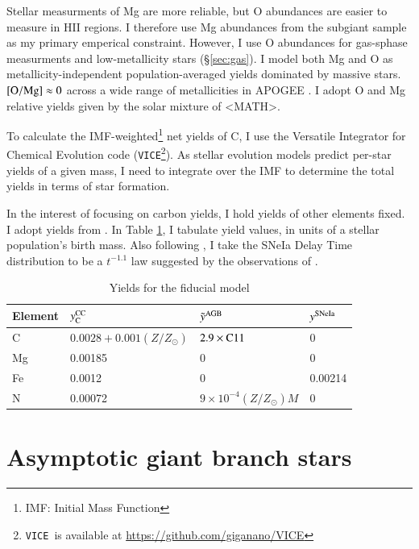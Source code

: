 \documentclass[12pt,oneside]{report}
\newcommand{\VICE}{\texttt{VICE}}
\newcommand{\Ycc}{\ensuremath{y_{\rm C}^{\rm CC}}}
\begin{document}
Stellar measurments of Mg are more reliable, but O abundances are easier to measure in HII regions. 
I therefore use Mg abundances from the \citet{jack_subgiant} subgiant sample as my primary emperical constraint. However, I use O abundances for gas-sphase measurments and low-metallicity stars (\S \ref{sec:gas}). I model both Mg and O as metallicity-independent population-averaged yields dominated by massive stars. ${\rm [O/Mg]}\approx 0$ across a wide range of metallicities in APOGEE \citep{Weinberg+19, Weinberg+22}. 
I adopt O and Mg relative yields given by the solar mixture of \cite{asplund+09} <MATH>.

To calculate the IMF-weighted\footnote{IMF: Initial Mass Function} net yields of C, I use the Versatile Integrator for Chemical Evolution code (\VICE\footnote{\VICE~is available at \url{https://github.com/giganano/VICE}}).
As stellar evolution models predict per-star yields of a given mass, I need to integrate over the IMF to determine the total yields in terms of star formation.

In the interest of focusing on carbon yields, I hold yields of other elements fixed. 
I adopt yields from \citet{james+21, james+22}.
In Table \ref{tab:fiducial_mod}, I tabulate yield values, in units of a stellar population's birth mass.
Also following \citet{james+21, james+22}, I take the SNeIa Delay Time distribution to be a
$t^{-1.1}$ law suggested by the observations of \citet{maoz+12}.


\begin{table}
	\centering
    \caption[Fiducial Model]{Yields for the fiducial model}
	\label{tab:fiducial_mod}

	\begin{tabular}{l l l l}
		\toprule
        Element & $\Ycc$ & $\tilde{y}^{\rm AGB}$ & $y^{\rm SNe Ia}$ \\
		\midrule
        C & $0.0028 + 0.001(Z/Z_\odot)$ & $2.9\times{\rm C11}$ &  0 \\
        Mg & 0.00185 & 0 & 0 \\
        Fe & 0.0012 & 0 & 0.00214 \\
        N & 0.00072 & $9\times10^{-4}(Z/Z_\odot)M$ & 0\\
		\bottomrule
	\end{tabular}
\end{table}

\section{Asymptotic giant branch stars}\label{sec:agb}
\end{document}
